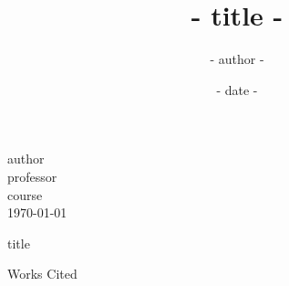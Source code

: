 \documentclass[12pt]{scrartcl} %
\title{ {{- title -}} }
\author{ {{- author -}} }
\date{ {{- date -}} }
\begin{document}
\begin{flushleft}
  {{ author }}\\
  {{ professor }}\\
  {{ course }}\\
  \today\\
\end{flushleft}

\begin{center}
  {{ title }}
\end{center}

%
%

\clearpage
\begin{center}
  Works Cited
\end{center}
\printbibliography[heading=none]
\end{document}
